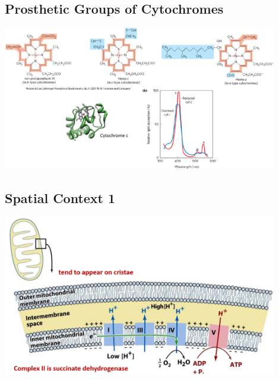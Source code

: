 \documentclass[10pt]{article}
\begin{document}
\subsection*{Prosthetic Groups of Cytochromes}
\begin{center} 
	\includegraphics*[width=0.9\textwidth]{L1_8.png}
\end{center}

\subsection*{Spatial Context 1}
\begin{center} 
	\includegraphics*[width=0.9\textwidth]{L1_9.png}
\end{center}
\end{document}
